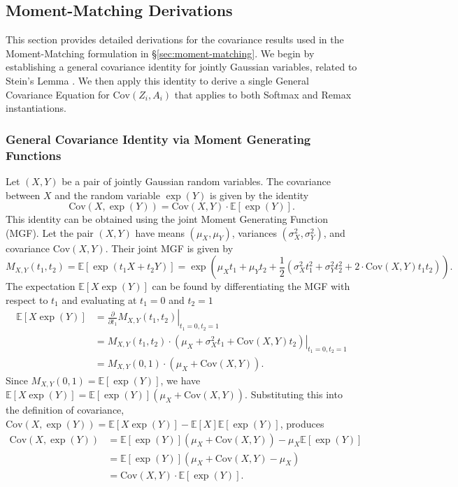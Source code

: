 \documentclass{uai2026} %
\begin{document}
\subsection{Moment-Matching Derivations}
\label{app:prob_softmax_derivations}
This section provides detailed derivations for the covariance results used in the Moment-Matching formulation in \S\ref{sec:moment-matching}. We begin by establishing a general covariance identity for jointly Gaussian variables, related to Stein's Lemma \citep{stein1981lemma}. We then apply this identity to derive a single General Covariance Equation for $\text{Cov}(Z_i, A_i)$ that applies to both Softmax and Remax instantiations.

\subsubsection{General Covariance Identity via Moment Generating Functions}
Let $(X, Y)$ be a pair of jointly Gaussian random variables. The covariance between $X$ and the random variable $\exp(Y)$ is given by the identity
\begin{equation}
\label{eq:general_cov_identity}
\text{Cov}(X, \exp(Y)) = \text{Cov}(X, Y) \cdot \mathbb{E}[\exp(Y)].
\end{equation}
This identity can be obtained using the joint Moment Generating Function (MGF). Let the pair $(X, Y)$ have means $(\mu_X, \mu_Y)$, variances $(\sigma_X^2, \sigma_Y^2)$, and covariance $\text{Cov}(X,Y)$. Their joint MGF is given by
$$
M_{X,Y}(t_1, t_2) = \mathbb{E}[\exp({t_1 X + t_2 Y})] = \exp\left(\mu_X t_1 + \mu_Y t_2 + \frac{1}{2}(\sigma_X^2 t_1^2 + \sigma_Y^2 t_2^2 + 2 \cdot \text{Cov}(X,Y)t_1 t_2)\right).
$$
The expectation $\mathbb{E}[X \exp(Y)]$ can be found by differentiating the MGF with respect to $t_1$ and evaluating at $t_1=0$ and $t_2=1$
\begin{align*}
\mathbb{E}[X \exp(Y)] &= \left.\frac{\partial}{\partial t_1} M_{X,Y}(t_1, t_2)\right|_{t_1=0, t_2=1} \\
&= \left. M_{X,Y}(t_1, t_2) \cdot (\mu_X + \sigma_X^2 t_1 + \text{Cov}(X,Y)t_2) \right|_{t_1=0, t_2=1} \\
&= M_{X,Y}(0, 1) \cdot (\mu_X + \text{Cov}(X,Y)).
\end{align*}
Since $M_{X,Y}(0, 1) = \mathbb{E}[\exp(Y)]$, we have $\mathbb{E}[X \exp(Y)] = \mathbb{E}[\exp(Y)] (\mu_X + \text{Cov}(X,Y))$. Substituting this into the definition of covariance, $\text{Cov}(X, \exp(Y)) = \mathbb{E}[X \exp(Y)] - \mathbb{E}[X]\mathbb{E}[\exp(Y)]$, produces
\begin{align*}
\text{Cov}(X, \exp(Y)) &= \mathbb{E}[\exp(Y)] (\mu_X + \text{Cov}(X,Y)) - \mu_X \mathbb{E}[\exp(Y)] \\
&= \mathbb{E}[\exp(Y)] (\mu_X + \text{Cov}(X,Y) - \mu_X) \\
&= \text{Cov}(X, Y) \cdot \mathbb{E}[\exp(Y)].
\end{align*}
\end{document}

